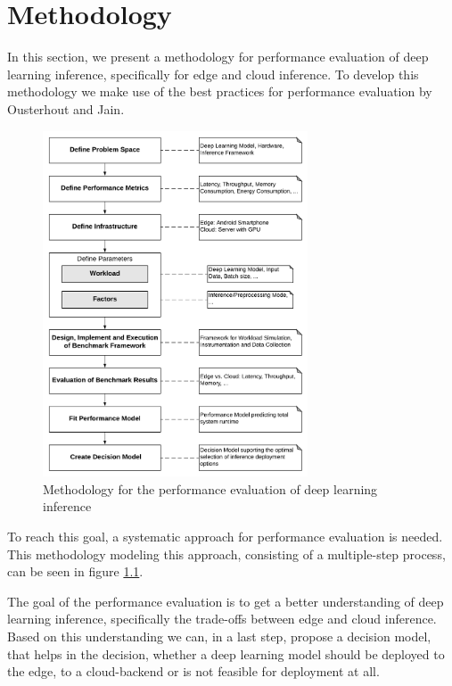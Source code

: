 \chapter{Methodology}
\label{chap:methodology}

In this section, we present a methodology for performance evaluation of deep learning inference, specifically for edge and cloud inference.
To develop this methodology we make use of the best practices for performance evaluation by Ousterhout \cite{Ousterhout:2018:AMO:3234519.3213770} and Jain\cite{books/daglib/0076234}.


\begin{figure}[!htb]
\centering
\includegraphics[width=0.7\textwidth]{./Bilder/Methodology.pdf}
\caption{Methodology for the performance evaluation of deep learning inference}
\label{fig:Methodology}
\end{figure}
To reach this goal, a systematic approach for performance evaluation is needed.
This methodology modeling this approach, consisting of a multiple-step process, can be seen in figure \ref{fig:Methodology}. 


The goal of the performance evaluation is to get a better understanding of deep learning inference, specifically the trade-offs between edge and cloud inference.
Based on this understanding we can, in a last step, propose a decision model, that helps in the decision, whether a deep learning model should be deployed to the edge, to a cloud-backend or is not feasible for deployment at all.


